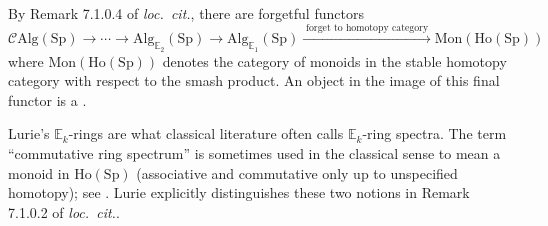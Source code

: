 \begin{definition}
    By Remark 7.1.0.4 of \emph{loc.\ cit.}, there are forgetful functors
    $$ \mathcal{C}\mathrm{Alg}(\mathrm{Sp}) \to \cdots \to \mathrm{Alg}_{\mathbb{E}_2}(\mathrm{Sp}) \to \mathrm{Alg}_{\mathbb{E}_1}(\mathrm{Sp}) \xrightarrow{\;\text{forget to homotopy category}\;} \mathrm{Mon}(\mathrm{Ho}(\mathrm{Sp})) $$
    where $\mathrm{Mon}(\mathrm{Ho}(\mathrm{Sp}))$ denotes the category of monoids in the stable homotopy category with respect to the smash product. An object in the image of this final functor is a .

    \begin{remark}[Terminology]
        Lurie's $\mathbb{E}_k$-rings are what classical literature often calls $\mathbb{E}_k$-ring spectra. The term ``commutative ring spectrum'' is sometimes used in the classical sense to mean a monoid in $\mathrm{Ho}(\mathrm{Sp})$ (associative and commutative only up to unspecified homotopy); see . Lurie explicitly distinguishes these two notions in Remark 7.1.0.2 of \emph{loc.\ cit.}.
    \end{remark}
\end{definition}
